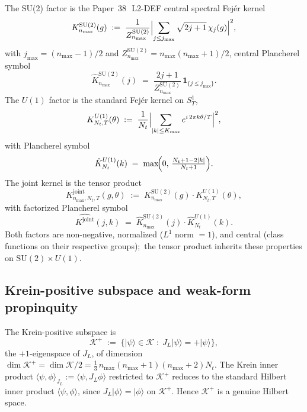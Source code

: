 \documentclass[11pt,a4paper]{article}
\theoremstyle{plain}
\theoremstyle{definition}
\newcommand{\nmax}{n_{\max}}
\newcommand{\Nt}{N_{t}}
\newcommand{\Kmax}{K_{\max}}
\newcommand{\SoneT}{S^{1}_{T}}
\newcommand{\Krein}{\mathcal{K}}
\newcommand{\SU}{\mathrm{SU}}
\newcommand{\Uone}{U(1)}
\newcommand{\JL}{J_{L}}
\newcommand{\Kjoint}{K^{\mathrm{joint}}}
\newcommand{\KSU}{K^{\SU(2)}}
\newcommand{\KU}{K^{\Uone}}
\newcommand{\Kplus}{\Krein^{+}}
\newcommand{\Plancherel}{\hat}
\begin{document}
The SU(2) factor is the Paper~38~\cite{paper38}\,L2-DEF central
spectral Fej\'er kernel
\begin{equation}\label{eq:K_SU2_def}
   \KSU_{\nmax}(g) \;:=\; \frac{1}{Z^{\SU(2)}_{\nmax}}
   \Bigl|\sum_{j \le j_{\max}}
      \sqrt{2j+1}\,\chi_{j}(g)\Bigr|^{2},
\end{equation}
with $j_{\max} = (\nmax-1)/2$ and
$Z^{\SU(2)}_{\nmax} = \nmax(\nmax+1)/2$, central Plancherel symbol
\begin{equation}\label{eq:K_SU2_plancherel}
   \Plancherel{K}^{\SU(2)}_{\nmax}(j) \;=\;
   \frac{2j + 1}{Z^{\SU(2)}_{\nmax}}\,\mathbf{1}_{\{j \le j_{\max}\}}.
\end{equation}
The $\Uone$ factor is the standard Fej\'er kernel on $\SoneT$,
\begin{equation}\label{eq:K_U1_def}
   \KU_{\Nt, T}(\theta) \;:=\; \frac{1}{\Nt}
   \Bigl|\sum_{|k| \le \Kmax} e^{i \, 2\pi k\theta / T}\Bigr|^{2},
\end{equation}
with Plancherel symbol
\begin{equation}\label{eq:K_U1_plancherel}
   \Plancherel{K}^{\Uone}_{\Nt}(k) \;=\;
   \max\!\Bigl(0,\, \tfrac{\Nt + 1 - 2|k|}{\Nt + 1}\Bigr).
\end{equation}
The joint kernel is the tensor product
\begin{equation}\label{eq:K_joint_def}
   \Kjoint_{\nmax,\Nt,T}(g, \theta)
   \;:=\; \KSU_{\nmax}(g) \cdot \KU_{\Nt, T}(\theta),
\end{equation}
with factorized Plancherel symbol
\begin{equation}\label{eq:K_joint_plancherel}
   \Plancherel{\Kjoint}(j, k)
   \;=\; \Plancherel{K}^{\SU(2)}_{\nmax}(j) \cdot
         \Plancherel{K}^{\Uone}_{\Nt}(k).
\end{equation}
Both factors are non-negative, normalized ($L^{1}$ norm $= 1$), and
central (class functions on their respective groups);\ the tensor
product inherits these properties on $\SU(2) \times \Uone$.

\subsection{Krein-positive subspace and weak-form propinquity}
\label{sec:Kplus_definition}

The Krein-positive subspace is
\begin{equation}\label{eq:Kplus_def}
   \Kplus \;:=\; \{|\psi\rangle \in \Krein \;:\;
                  \JL|\psi\rangle = +|\psi\rangle\},
\end{equation}
the $+1$-eigenspace of $\JL$, of dimension
$\dim\Kplus = \dim\Krein / 2 = \tfrac{1}{3}\,\nmax(\nmax+1)(\nmax+2)\Nt$.
The Krein inner product
$\langle \psi, \phi \rangle_{\JL} := \langle \psi, \JL \phi\rangle$
restricted to $\Kplus$ reduces to the standard Hilbert inner product
$\langle \psi, \phi\rangle$, since $\JL|\phi\rangle = |\phi\rangle$ on
$\Kplus$. Hence $\Kplus$ is a genuine Hilbert space.
\end{document}
